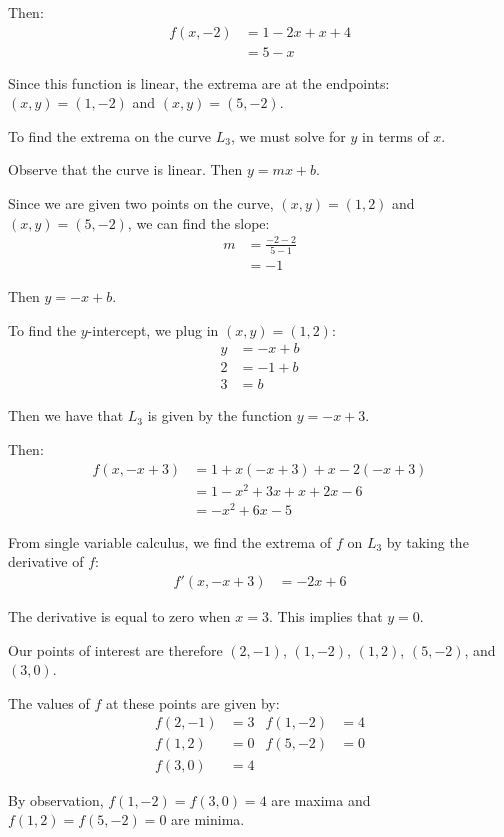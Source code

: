 \begin{solution}
    Then:
    \begin{align*}
        f(x, -2) &= 1 -2x + x + 4 \\
        &= 5 - x
    \end{align*}
    
    Since this function is linear, the extrema are at the endpoints: \((x, y) = (1, -2)\) and \((x, y) = (5, -2)\).
    
    To find the extrema on the curve \(L_3\), we must solve for \(y\) in terms of \(x\).
    
    Observe that the curve is linear. Then \(y = mx + b\).
    
    Since we are given two points on the curve, \((x, y) = (1, 2)\) and \((x, y) = (5, -2)\), we can find the slope:
    \begin{align*}
        m &= \frac{-2 - 2}{5 - 1} \\
        &= -1
    \end{align*}
    
    Then \(y = -x + b\).
    
    To find the \(y\)-intercept, we plug in \((x, y) = (1, 2)\):
    \begin{align*}
        y &= -x + b \\
        2 &= -1 + b \\
        3 &= b
    \end{align*}
    
    Then we have that \(L_3\) is given by the function \(y = -x + 3\).
    
    Then:
    \begin{align*}
        f(x, -x + 3) &= 1 + x(-x + 3) + x - 2(-x + 3) \\
        &= 1 - x^2 + 3x + x + 2x - 6 \\
        &= - x^2 + 6x - 5
    \end{align*}
    
    From single variable calculus, we find the extrema of \(f\) on \(L_3\) by taking the derivative of \(f\):
    \begin{align*}
        f'(x, -x + 3) &= -2x + 6
    \end{align*}
    
    The derivative is equal to zero when \(x = 3\). This implies that \(y = 0\).
    
    Our points of interest are therefore \((2, -1)\), \((1, -2)\), \((1, 2)\), \((5, -2)\), and \((3, 0)\).
    
    The values of \(f\) at these points are given by:
    \begin{align*}
        f(2, -1) &= 3 & f(1, -2) &= 4 \\
        f(1, 2) &= 0 & f(5, -2) &= 0 \\
        f(3, 0) &= 4
    \end{align*}
    
    By observation, \(f(1, -2) = f(3, 0) = 4\) are maxima and \(f(1, 2) = f(5, -2) = 0\) are minima.
\end{solution}

